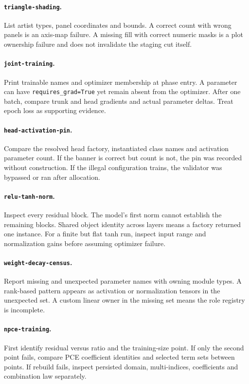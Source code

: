 \documentclass[10pt,aps,prd,twocolumn,nofootinbib]{revtex4-2}
\newcommand{\code}[1]{\texttt{#1}}
\begin{document}
\paragraph{\code{triangle-shading}.}
List artist types, panel coordinates and bounds.  A correct count with wrong
panels is an axis-map failure.  A missing fill with correct numeric masks is a
plot ownership failure and does not invalidate the staging cut itself.

\paragraph{\code{joint-training}.}
Print trainable names and optimizer membership at phase entry.  A parameter
can have \code{requires\_grad=True} yet remain absent from the optimizer.
After one batch, compare trunk and head gradients and actual parameter deltas.
Treat epoch loss as supporting evidence.

\paragraph{\code{head-activation-pin}.}
Compare the resolved head factory, instantiated class names and activation
parameter count.  If the banner is correct but count is not, the pin was
recorded without construction.  If the illegal configuration trains, the
validator was bypassed or ran after allocation.

\paragraph{\code{relu-tanh-norm}.}
Inspect every residual block.  The model's first norm cannot establish the
remaining blocks.  Shared object identity across layers means a factory
returned one instance.  For a
finite but flat tanh run, inspect input range and normalization gains before
assuming optimizer failure.

\paragraph{\code{weight-decay-census}.}
Report missing and unexpected parameter names with owning module types.  A
rank-based pattern appears as activation or normalization tensors in the
unexpected set.  A custom linear owner in the missing set means the role
registry is incomplete.

\paragraph{\code{npce-training}.}
First identify residual versus ratio and the training-size point.  If only the
second point fails, compare PCE coefficient identities and selected term sets
between points.  If rebuild fails, inspect persisted domain, multi-indices,
coefficients and combination law separately.
\end{document}

